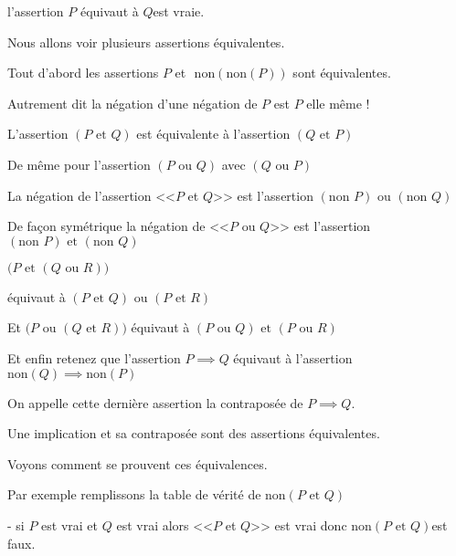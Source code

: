 l'assertion \og $P$ équivaut à $Q$\fg est vraie.


\diapo

Nous allons voir plusieurs assertions équivalentes.

Tout d'abord les assertions $P$ et $\text{ non}(\text{non}(P))$
sont équivalentes.

Autrement dit la négation d'une négation de $P$ est $P$ elle même !


\change

L'assertion $(P \text{ et } Q)$ est équivalente à l'assertion $(Q \text{ et } P)$

\change

De même pour l'assertion $(P \text{ ou } Q)$ avec $(Q \text{ ou } P)$


\change

La négation de l'assertion <<$P$ et $Q$>> est l'assertion 
$(\text{non } P)  \text{ ou } (\text{non }Q)$

\change

De façon symétrique la négation de <<$P$ ou $Q$>>
est l'assertion $(\text{non } P)  \text{ et } (\text{non }Q)$

\change

 $\big(P \text{ et } (Q \text{ ou } R)  \big)$

équivaut à  
$(P \text{ et } Q) \text{ ou } (P \text{ et }  R)$

\change

Et  $\big(P \text{ ou } (Q \text{ et } R)  \big)$ équivaut à
$(P \text{ ou } Q) \text{ et } (P \text{ ou }  R)$

\change

Et enfin retenez que
l'assertion
 \og $P \implies Q$\fg 
équivaut à l'assertion 
 \og $\text{non}(Q) \implies \text{non}(P)$\fg


On appelle cette dernière assertion la contraposée de \og $P \implies Q$\fg.

Une implication et sa contraposée sont des assertions équivalentes.


\diapo


Voyons comment se prouvent ces équivalences.

Par exemple remplissons la table de vérité de \og $\text{non}(P \text{ et } Q)$\fg 

\change

- si $P$ est vrai et $Q$ est vrai alors <<$P$ et $Q$>> est vrai
donc \og $\text{non}(P \text{ et } Q)$\fg  est faux.

